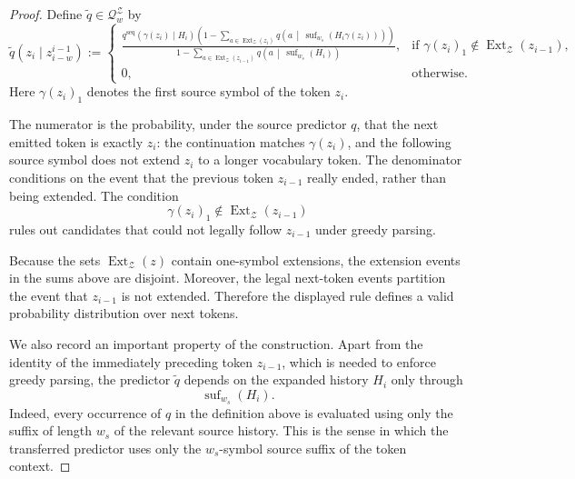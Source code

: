 \documentclass{article}
\theoremstyle{plain}
\theoremstyle{definition}
\theoremstyle{remark}
\begin{document}
\begin{proof}
    Define \(\tilde q\in\mathcal Q_w^{\mathcal Z}\) by
    \[
    \tilde q(z_i\mid z_{i-w}^{i-1})
    :=
    \begin{cases}
    \displaystyle
    \frac{
    q^{\mathrm{seq}}\!\left(\gamma(z_i)\mid H_i\right)
    \left(
    1
    -
    \sum_{a\in\operatorname{Ext}_{\mathcal Z}(z_i)}
    q\!\left(
        a
        \,\middle|\,
        \operatorname{suf}_{w_s}(H_i\gamma(z_i))
    \right)
    \right)
    }{
    1
    -
    \sum_{a\in\operatorname{Ext}_{\mathcal Z}(z_{i-1})}
    q\!\left(
        a
        \,\middle|\,
        \operatorname{suf}_{w_s}(H_i)
    \right)
    },
    &
    \text{if } \gamma(z_i)_1\notin\operatorname{Ext}_{\mathcal Z}(z_{i-1}),
    \\[3ex]
    0,
    &
    \text{otherwise.}
    \end{cases}
    \]
    Here \(\gamma(z_i)_1\) denotes the first source symbol of the token \(z_i\).
    
    The numerator is the probability, under the source predictor \(q\), that the
    next emitted token is exactly \(z_i\): the continuation matches
    \(\gamma(z_i)\), and the following source symbol does not extend \(z_i\) to a
    longer vocabulary token. The denominator conditions on the event that the
    previous token \(z_{i-1}\) really ended, rather than being extended. The
    condition
    \[
        \gamma(z_i)_1\notin\operatorname{Ext}_{\mathcal Z}(z_{i-1})
    \]
    rules out candidates that could not legally follow \(z_{i-1}\) under greedy
    parsing.
    
    Because the sets \(\operatorname{Ext}_{\mathcal Z}(z)\) contain one-symbol
    extensions, the extension events in the sums above are disjoint. Moreover, the
    legal next-token events partition the event that \(z_{i-1}\) is not extended.
    Therefore the displayed rule defines a valid probability distribution over
    next tokens.
    
    We also record an important property of the construction. Apart from the
    identity of the immediately preceding token \(z_{i-1}\), which is needed to
    enforce greedy parsing, the predictor \(\tilde q\) depends on the expanded
    history \(H_i\) only through
    \[
        \operatorname{suf}_{w_s}(H_i).
    \]
    Indeed, every occurrence of \(q\) in the definition above is evaluated using
    only the suffix of length \(w_s\) of the relevant source history. This is the
    sense in which the transferred predictor uses only the \(w_s\)-symbol source
    suffix of the token context.
    

\end{proof}
\end{document}
